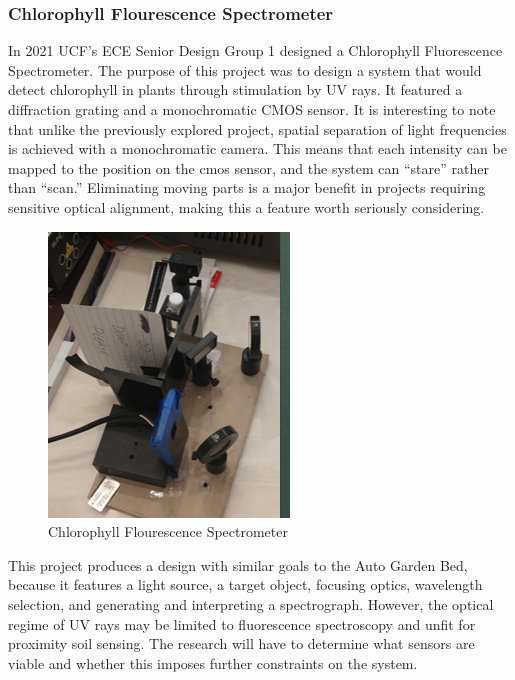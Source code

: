 \subsubsection{Chlorophyll Flourescence Spectrometer}



In 2021 UCF’s ECE Senior Design Group 1 designed a Chlorophyll Fluorescence Spectrometer. The purpose of this project was to design a system that would detect chlorophyll in plants through stimulation by UV rays. It featured a diffraction grating and a monochromatic CMOS sensor. It is interesting to note that unlike the previously explored project, spatial separation of light frequencies is achieved with a monochromatic camera. This means that each intensity can be mapped to the position on the cmos sensor, and the system can “stare” rather than “scan.” Eliminating moving parts is a major benefit in projects requiring sensitive optical alignment, making this a feature worth seriously considering.

\begin{figure}[H]
    \caption{Chlorophyll Flourescence Spectrometer}
    \centering
    \includegraphics[width=.5\textwidth]{images/3-1-2Pic.png}
\end{figure}

This project produces a design with similar goals to the Auto Garden Bed, because it features a light source, a target object, focusing optics, wavelength selection, and generating and interpreting a spectrograph. However, the optical regime of UV rays may be limited to fluorescence spectroscopy and unfit for proximity soil sensing. The research will have to determine what sensors are viable and whether this imposes further constraints on the system.


